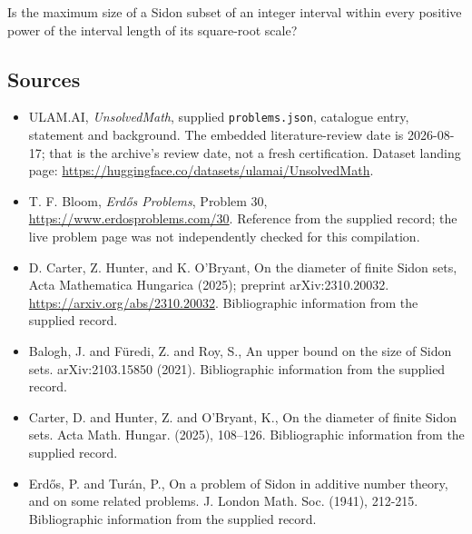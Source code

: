 \documentclass[11pt,a4paper]{article}
\begin{document}
Is the maximum size of a Sidon subset of an integer interval within every positive power of the interval length of its square-root scale?

\subsection{Sources}

{\small

\begin{itemize}

\item[\hypertarget{source:statement:1}{S1}] ULAM.AI, \emph{UnsolvedMath}, supplied \texttt{problems.json}, catalogue entry, statement and background. The embedded literature-review date is 2026-08-17; that is the archive’s review date, not a fresh certification. Dataset landing page: \url{https://huggingface.co/datasets/ulamai/UnsolvedMath}.

\item[\hypertarget{source:statement:2}{S2}] T. F. Bloom, \emph{Erdős Problems}, Problem 30, \url{https://www.erdosproblems.com/30}. Reference from the supplied record; the live problem page was not independently checked for this compilation.

\item[\hypertarget{source:statement:3}{S3}] D. Carter, Z. Hunter, and K. O'Bryant, On the diameter of finite Sidon sets, Acta Mathematica Hungarica (2025); preprint arXiv:2310.20032. \url{https://arxiv.org/abs/2310.20032}. Bibliographic information from the supplied record.

\item[\hypertarget{source:statement:4}{S4}] Balogh, J. and F\"{u}redi, Z. and Roy, S., An upper bound on the size of Sidon sets. arXiv:2103.15850 (2021). Bibliographic information from the supplied record.

\item[\hypertarget{source:statement:5}{S5}] Carter, D. and Hunter, Z. and O'Bryant, K., On the diameter of finite {S}idon sets. Acta Math. Hungar. (2025), 108--126. Bibliographic information from the supplied record.

\item[\hypertarget{source:statement:6}{S6}] Erd\H{o}s, P. and Tur\'{a}n, P., On a problem of Sidon in additive number theory, and on some related problems. J. London Math. Soc. (1941), 212-215. Bibliographic information from the supplied record.

\end{itemize}

}

\label{end:statement}
\end{document}
